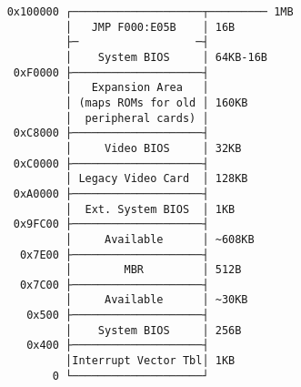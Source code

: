 \documentclass[varwidth]{standalone}
\begin{document}
\begin{verbatim}
    0x100000 ┌────────────────────┬───────── 1MB
             │   JMP F000:E05B    │ 16B
             ├─                  ─┤
             │    System BIOS     │ 64KB-16B
     0xF0000 ├────────────────────┤ 
             │   Expansion Area   │
             │ (maps ROMs for old │ 160KB
             │  peripheral cards) │
     0xC8000 ├────────────────────┤
             │     Video BIOS     │ 32KB
     0xC0000 ├────────────────────┤
             │ Legacy Video Card  │ 128KB
     0xA0000 ├────────────────────┤
             │  Ext. System BIOS  │ 1KB
     0x9FC00 ├────────────────────┤
             │     Available      │ ~608KB
      0x7E00 ├────────────────────┤
             │        MBR         │ 512B
      0x7C00 ├────────────────────┤
             │     Available      │ ~30KB
       0x500 ├────────────────────┤ 
             │    System BIOS     │ 256B
       0x400 ├────────────────────┤
             │Interrupt Vector Tbl│ 1KB
           0 └────────────────────┘ 
\end{verbatim}
\end{document}
